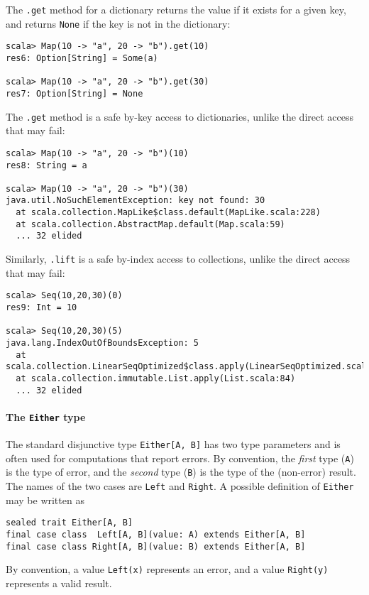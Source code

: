 The \lstinline!.get! method for a dictionary returns the value if
it exists for a given key, and returns \lstinline!None! if the key
is not in the dictionary:
\begin{lstlisting}
scala> Map(10 -> "a", 20 -> "b").get(10)
res6: Option[String] = Some(a)

scala> Map(10 -> "a", 20 -> "b").get(30)
res7: Option[String] = None 
\end{lstlisting}
The \lstinline!.get! method is a safe by-key access to dictionaries,
unlike the direct access that may fail:
\begin{lstlisting}
scala> Map(10 -> "a", 20 -> "b")(10)
res8: String = a 

scala> Map(10 -> "a", 20 -> "b")(30)
java.util.NoSuchElementException: key not found: 30
  at scala.collection.MapLike$class.default(MapLike.scala:228)
  at scala.collection.AbstractMap.default(Map.scala:59)
  ... 32 elided
\end{lstlisting}
Similarly, \lstinline!.lift! is a safe by-index access to collections,
unlike the direct access that may fail:
\begin{lstlisting}
scala> Seq(10,20,30)(0)
res9: Int = 10

scala> Seq(10,20,30)(5)
java.lang.IndexOutOfBoundsException: 5
  at scala.collection.LinearSeqOptimized$class.apply(LinearSeqOptimized.scala:65)
  at scala.collection.immutable.List.apply(List.scala:84)
  ... 32 elided
\end{lstlisting}


\paragraph{The \texttt{Either} type}

The standard disjunctive type \lstinline!Either[A, B]! has two type
parameters and is often used for computations that report errors.
By convention, the \emph{first} type (\lstinline!A!) is the type
of error, and the \emph{second} type (\lstinline!B!) is the type
of the (non-error) result. The names of the two cases are \lstinline!Left!
and \lstinline!Right!. A possible definition of \lstinline!Either!
may be written as
\begin{lstlisting}
sealed trait Either[A, B]
final case class  Left[A, B](value: A) extends Either[A, B]
final case class Right[A, B](value: B) extends Either[A, B]
\end{lstlisting}
By convention, a value \lstinline!Left(x)! represents an error, and
a value \lstinline!Right(y)! represents a valid result.

